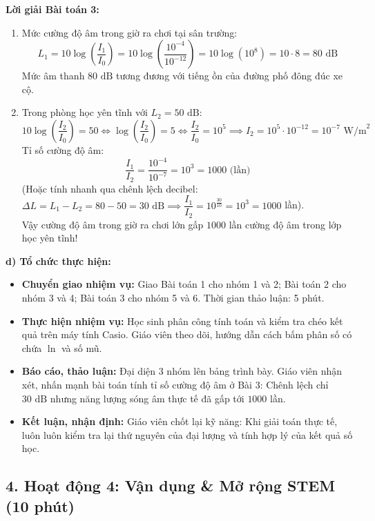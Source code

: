 \documentclass[12pt, a4paper]{article}
\begin{document}
\textbf{Lời giải Bài toán 3:}
\begin{enumerate}[label=\alph*)]
    \item Mức cường độ âm trong giờ ra chơi tại sân trường:
    $$L_1 = 10 \log\left(\dfrac{I_1}{I_0}\right) = 10 \log\left(\dfrac{10^{-4}}{10^{-12}}\right) = 10 \log(10^8) = 10 \cdot 8 = 80 \text{ dB}$$
    Mức âm thanh $80\text{ dB}$ tương đương với tiếng ồn của đường phố đông đúc xe cộ.

    \item Trong phòng học yên tĩnh với $L_2 = 50\text{ dB}$:
    $$10 \log\left(\dfrac{I_2}{I_0}\right) = 50 \iff \log\left(\dfrac{I_2}{I_0}\right) = 5 \iff \dfrac{I_2}{I_0} = 10^5 \implies I_2 = 10^5 \cdot 10^{-12} = 10^{-7} \text{ W/m}^2$$
    Tỉ số cường độ âm:
    $$\dfrac{I_1}{I_2} = \dfrac{10^{-4}}{10^{-7}} = 10^3 = 1000 \text{ (lần)}$$
    (Hoặc tính nhanh qua chênh lệch decibel: $\Delta L = L_1 - L_2 = 80 - 50 = 30\text{ dB} \implies \dfrac{I_1}{I_2} = 10^{\frac{30}{10}} = 10^3 = 1000$ lần).\\
    Vậy cường độ âm trong giờ ra chơi lớn gấp $1000$ lần cường độ âm trong lớp học yên tĩnh!
\end{enumerate}

\noindent \textbf{d) Tổ chức thực hiện:}
\begin{itemize}[leftmargin=0.6cm]
    \item \textbf{Chuyển giao nhiệm vụ:} Giao Bài toán 1 cho nhóm 1 và 2; Bài toán 2 cho nhóm 3 và 4; Bài toán 3 cho nhóm 5 và 6. Thời gian thảo luận: 5 phút.
    \item \textbf{Thực hiện nhiệm vụ:} Học sinh phân công tính toán và kiểm tra chéo kết quả trên máy tính Casio. Giáo viên theo dõi, hướng dẫn cách bấm phân số có chứa $\ln$ và số mũ.
    \item \textbf{Báo cáo, thảo luận:} Đại diện 3 nhóm lên bảng trình bày. Giáo viên nhận xét, nhấn mạnh bài toán tính tỉ số cường độ âm ở Bài 3: Chênh lệch chỉ $30\text{ dB}$ nhưng năng lượng sóng âm thực tế đã gấp tới $1000$ lần.
    \item \textbf{Kết luận, nhận định:} Giáo viên chốt lại kỹ năng: Khi giải toán thực tế, luôn luôn kiểm tra lại thứ nguyên của đại lượng và tính hợp lý của kết quả số học.
\end{itemize}

\vspace{5pt}

\subsection*{4. Hoạt động 4: Vận dụng \& Mở rộng STEM (10 phút)}
\end{document}
